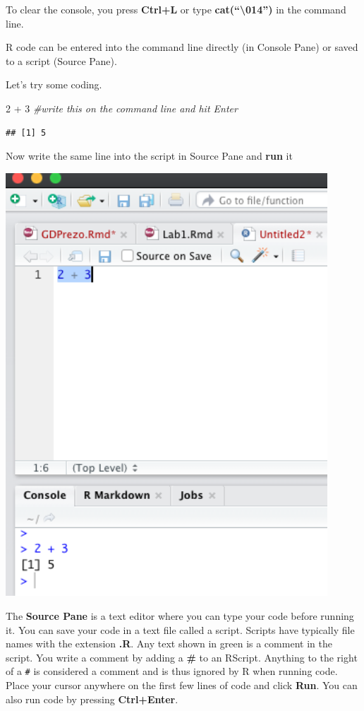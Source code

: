 \documentclass[
]{book}
\newenvironment{Shaded}{\begin{snugshade}}{\end{snugshade}}
\newcommand{\CommentTok}[1]{\textcolor[rgb]{0.56,0.35,0.01}{\textit{#1}}}
\newcommand{\DecValTok}[1]{\textcolor[rgb]{0.00,0.00,0.81}{#1}}
\newcommand{\SpecialCharTok}[1]{\textcolor[rgb]{0.00,0.00,0.00}{#1}}
\begin{document}
To clear the console, you press \textbf{Ctrl+L} or type \textbf{cat(``\textbackslash014'')} in the command line.

R code can be entered into the command line directly (in Console Pane) or saved to a script (Source Pane).

Let's try some coding.

\begin{Shaded}
\begin{Highlighting}[]
\DecValTok{2} \SpecialCharTok{+} \DecValTok{3} \CommentTok{\#write this on the command line and hit Enter}
\end{Highlighting}
\end{Shaded}

\begin{verbatim}
## [1] 5
\end{verbatim}

Now write the same line into the script in Source Pane and \textbf{run} it

\includegraphics[width=4.75in]{png/Rstudio5}

The \textbf{Source Pane} is a text editor where you can type your code before running it. You can save your code in a text file called a script. Scripts have typically file names with the extension \textbf{.R}. Any text shown in green is a comment in the script. You write a comment by adding a \textbf{\#} to an RScript. Anything to the right of a \texttt{\#} is considered a comment and is thus ignored by R when running code. Place your cursor anywhere on the first few lines of code and click \textbf{Run}. You can also run code by pressing \textbf{Ctrl+Enter}.
\end{document}
